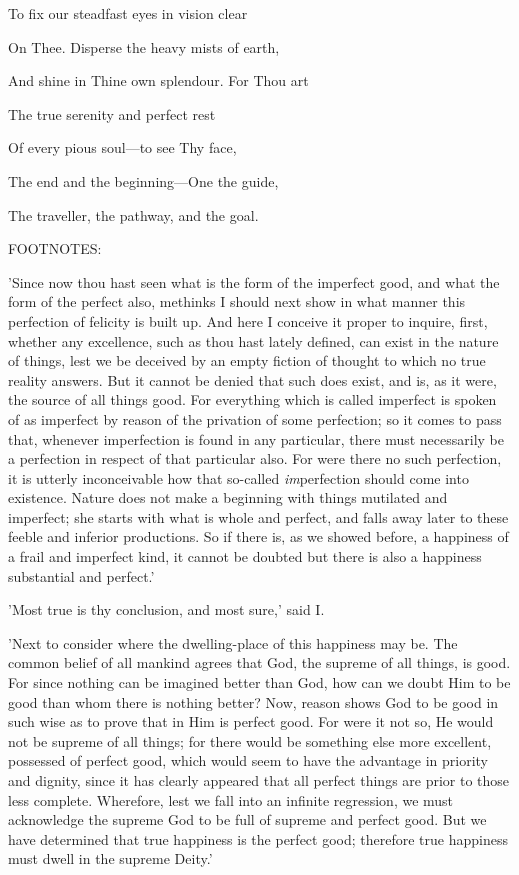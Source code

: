 To fix our steadfast eyes in vision clear

On Thee. Disperse the heavy mists of earth,

And shine in Thine own splendour. For Thou art

The true serenity and perfect rest

Of every pious soul—to see Thy face,

The end and the beginning—One the guide,

The traveller, the pathway, and the goal.

FOOTNOTES:


'Since now thou hast seen what is the form of the imperfect good, and
what the form of the perfect also, methinks I should next show in what
manner this perfection of felicity is built up. And here I conceive it
proper to inquire, first, whether any excellence, such as thou hast
lately defined, can exist in the nature of things, lest we be deceived
by an empty fiction of thought to which no true reality answers. But it
cannot be denied that such does exist, and is, as it were, the source of
all things good. For everything which is called imperfect is spoken of
as imperfect by reason of the privation of some perfection; so it comes
to pass that, whenever imperfection is found in any particular, there
must necessarily be a perfection in respect of that particular also. For
were there no such perfection, it is utterly inconceivable how that
so-called \emph{im}perfection should come into existence. Nature does not
make a beginning with things mutilated and imperfect; she starts with
what is whole and perfect, and falls away later to these feeble and
inferior productions. So if there is, as we showed before, a happiness
of a frail and imperfect kind, it cannot be doubted but there is also a
happiness substantial and perfect.'

'Most true is thy conclusion, and most sure,' said I.

'Next to consider where the dwelling-place of this happiness may be. The
common belief of all mankind agrees that God, the supreme of all things,
is good. For since nothing can be imagined better than God, how can we
doubt Him to be good than whom there is nothing better? Now, reason
shows God to be good in such wise as to prove that in Him is perfect
good. For were it not so, He would not be supreme of all things; for
there would be something else more excellent, possessed of perfect good,
which would seem to have the advantage in priority and dignity, since it
has clearly appeared that all perfect things are prior to those less
complete. Wherefore, lest we fall into an infinite regression, we must
acknowledge the supreme God to be full of supreme and perfect good. But
we have determined that true happiness is the perfect good; therefore
true happiness must dwell in the supreme Deity.'

